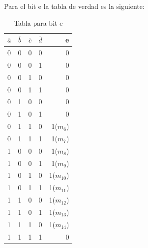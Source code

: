 \newline Para el bit e la tabla de verdad es la siguiente:
\begin{table}[h!]
	\begin{center}
		\caption{Tabla para bit e}
		\begin{tabular}{l|c|c|c|r}
			\textbf{$\overline{a}$} & \textbf{$\overline{b}$} & \textbf{$\overline{c}$} & \textbf{$\overline{d}$} & \textbf{e}  \\
			\hline
			0                       & 0                       & 0                       & 0                       & 0           \\
			0                       & 0                       & 0                       & 1                       & 0           \\	
			0                       & 0                       & 1                       & 0                       & 0           \\
			0                       & 0                       & 1                       & 1                       & 0           \\
			0                       & 1                       & 0                       & 0                       & 0           \\
			0                       & 1                       & 0                       & 1                       & 0           \\	
			0                       & 1                       & 1                       & 0                       & 1($m_{6}$)  \\
			0                       & 1                       & 1                       & 1                       & 1($m_{7}$)  \\		
			1                       & 0                       & 0                       & 0                       & 1($m_{8}$)  \\
			1                       & 0                       & 0                       & 1                       & 1($m_{9}$)  \\	
			1                       & 0                       & 1                       & 0                       & 1($m_{10}$) \\
			1                       & 0                       & 1                       & 1                       & 1($m_{11}$) \\
			1                       & 1                       & 0                       & 0                       & 1($m_{12}$) \\
			1                       & 1                       & 0                       & 1                       & 1($m_{13}$) \\	
			1                       & 1                       & 1                       & 0                       & 1($m_{14}$) \\
			1                       & 1                       & 1                       & 1                       & 0           \\			
		\end{tabular}
	\end{center}
\end{table}
